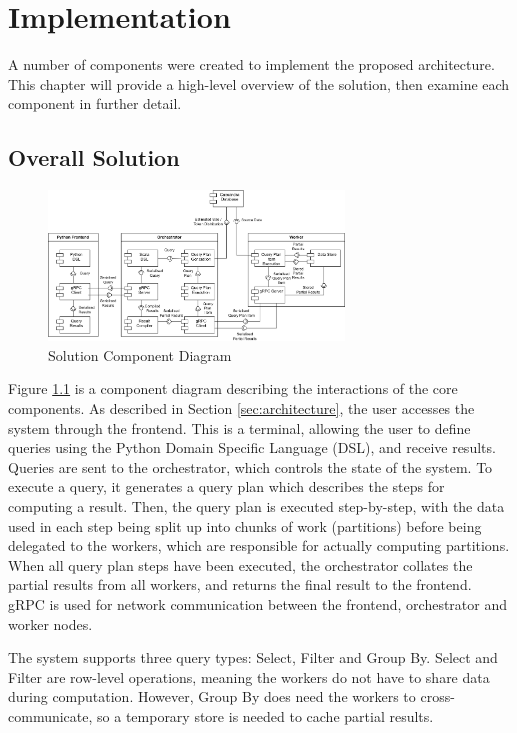 \chapter{Implementation}\label{cha:implementation}

A number of components were created to implement the proposed architecture. This chapter will provide a high-level overview of the solution, then examine each component in further detail.

\section{Overall Solution}
\begin{figure}[h]
	\centering
	\includegraphics[width=0.7\textwidth]{chapters/diagrams/implementation/component-architecture-diagram}
	\caption{Solution Component Diagram}
	\label{fig:component-architecture-diagram}
\end{figure}

Figure \ref{fig:component-architecture-diagram} is a component diagram describing the interactions of the core components. As described in Section \ref{sec:architecture}, the user accesses the system through the frontend. This is a terminal, allowing the user to define queries using the Python Domain Specific Language (DSL), and receive results. Queries are sent to the orchestrator, which controls the state of the system. To execute a query, it generates a query plan which describes the steps for computing a result. Then, the query plan is executed step-by-step, with the data used in each step being split up into chunks of work (partitions) before being delegated to the workers, which are responsible for actually computing partitions. When all query plan steps have been executed, the orchestrator collates the partial results from all workers, and returns the final result to the frontend. gRPC is used for network communication between the frontend, orchestrator and worker nodes.

The system supports three query types: Select, Filter and Group By. Select and Filter are row-level operations, meaning the workers do not have to share data during computation. However, Group By does need the workers to cross-communicate, so a temporary store is needed to cache partial results.

